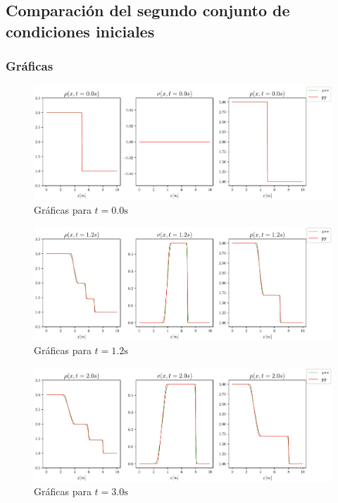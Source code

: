 \subsection{Comparación del segundo conjunto de condiciones iniciales}
\subsubsection{Gráficas}
\begin{figure}[H]
	\centering
	\includegraphics[width=1\linewidth]{../euler1D/plots_en_TDG/py_sin_claw/py_sod659/1.pdf}
	\caption{Gráficas para $t=0.0\unit{\s}$}
\end{figure}
\begin{figure}[H]
	\centering
	\includegraphics[width=1\linewidth]{../euler1D/plots_en_TDG/py_sin_claw/py_sod659/4.pdf}
	\caption{Gráficas para $t=1.2\unit{\s}$}
\end{figure}
\begin{figure}[H]
	\centering
	\includegraphics[width=1\linewidth]{../euler1D/plots_en_TDG/py_sin_claw/py_sod659/6.pdf}
	\caption{Gráficas para $t=3.0\unit{\s}$}
\end{figure}\vspace{\baselineskip}
